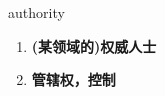 
\begin{frame}
{\huge authority}
\begin{center}
\begin{enumerate}\Large
  \item \textbf{(某领域的)权威人士}
  \item \textbf{管辖权，控制}
\end{enumerate}
\end{center}
\end{frame}
